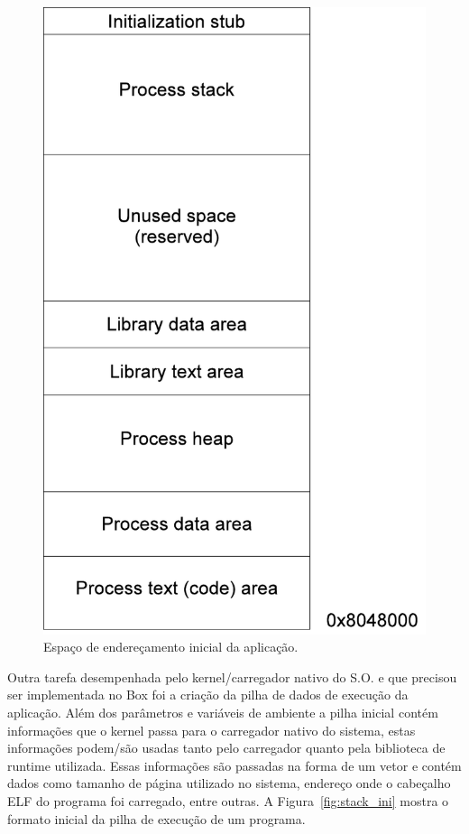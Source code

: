 \documentclass[11pt,twoside]{article}
\begin{document}
\begin{figure}[!h]
        \begin{center}
        \includegraphics[scale=0.5]{figures/esp_end}
        \end{center}
        \caption{Espaço de endereçamento inicial da aplicação.}
        \label{fig:esp_end}
\end{figure}

Outra tarefa desempenhada pelo kernel/carregador nativo do S.O. e que precisou ser
implementada no Box foi a criação da pilha de dados de execução da
aplicação. Além dos parâmetros e variáveis de ambiente a pilha inicial contém
informações que o kernel passa para o carregador nativo do sistema, estas
informações podem/são usadas tanto pelo carregador quanto pela biblioteca de
runtime utilizada. Essas informações são passadas na forma de um vetor e contém
dados como tamanho de página utilizado no sistema, endereço onde o
cabeçalho ELF do programa foi carregado, entre outras. A
Figura~\ref{fig:stack_ini} mostra o formato inicial da pilha de execução de um
programa.
\end{document}
